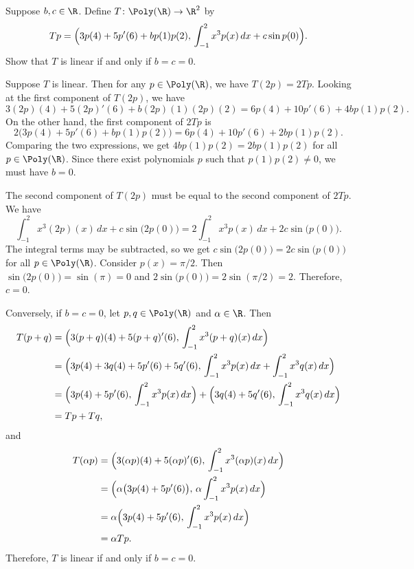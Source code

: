 \begin{exc}
\begin{exercise}
Suppose $b,c\in\R$. Define $T\colon\Poly(\R)\to\R^2$ by
\[ Tp=\Bigl(3p(4)+5p'(6)+bp(1)p(2),\,\int_{-1}^2x^3p(x)\,dx+c\sin p(0)\Bigr). \]
Show that $T$ is linear if and only if $b=c=0$.
\end{exercise}
\begin{solution}
Suppose $T$ is linear. Then for any $p\in\Poly(\R)$, we have $T(2p)=2Tp$.
Looking at the first component of $T(2p)$, we have
\[ 3(2p)(4)+5(2p)'(6)+b(2p)(1)(2p)(2)=6p(4)+10p'(6)+4bp(1)p(2). \]
On the other hand, the first component of $2Tp$ is
\[ 2\bigl(3p(4)+5p'(6)+bp(1)p(2)\bigr)=6p(4)+10p'(6)+2bp(1)p(2). \]
Comparing the two expressions, we get $4bp(1)p(2)=2bp(1)p(2)$ for all
$p\in\Poly(\R)$. Since there exist polynomials $p$ such that $p(1)p(2)\ne0$,
we must have $b=0$.

The second component of $T(2p)$ must be equal to the second component of
$2Tp$. We have
\[ \int_{-1}^2x^3(2p)(x)\,dx+c\sin\bigl(2p(0)\bigr)
   =2\int_{-1}^2x^3p(x)\,dx+2c\sin\bigl(p(0)\bigr). \]
The integral terms may be subtracted, so we get
$c\sin\bigl(2p(0)\bigr)=2c\sin\bigl(p(0)\bigr)$ for all $p\in\Poly(\R)$.
Consider $p(x)=\pi/2$. Then $\sin\bigl(2p(0)\bigr)=\sin(\pi)=0$ and
$2\sin\bigl(p(0)\bigr)=2\sin(\pi/2)=2$. Therefore, $c=0$.

Conversely, if $b=c=0$, let $p,q\in\Poly(\R)$ and $\alpha\in\R$. Then
\begin{align*}
T(p+q) &= \Bigl(3(p+q)(4)+5(p+q)'(6),\,\int_{-1}^2x^3(p+q)(x)\,dx\Bigr)\\
  &= \Bigl(3p(4)+3q(4)+5p'(6)+5q'(6),\,
     \int_{-1}^2x^3p(x)\,dx+\int_{-1}^2x^3q(x)\,dx\Bigr)\\
  &= \Bigl(3p(4)+5p'(6),\,\int_{-1}^2x^3p(x)\,dx\Bigr)
     +\Bigl(3q(4)+5q'(6),\,\int_{-1}^2x^3q(x)\,dx\Bigr)\\
  &= Tp+Tq,
\end{align*}
and
\begin{align*}
T(\alpha p) &= \Bigl(3(\alpha p)(4)+5(\alpha p)'(6),\,
     \int_{-1}^2x^3(\alpha p)(x)\,dx\Bigr)\\
  &= \Bigl(\alpha\bigl(3p(4)+5p'(6)\bigr),\,\alpha\int_{-1}^2x^3p(x)\,dx\Bigr)\\
  &= \alpha\Bigl(3p(4)+5p'(6),\,\int_{-1}^2x^3p(x)\,dx\Bigr)\\
  &= \alpha Tp.
\end{align*}
Therefore, $T$ is linear if and only if $b=c=0$.
\end{solution}


\end{exc}
